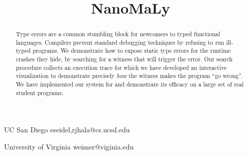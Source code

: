 \documentclass[blind,preprint,nocopyrightspace,10pt,squareay,clearpagebib,explicitsize]{sigplanconf-pldi15}
\theoremstyle{plain}%
\theoremstyle{definition}
\begin{document}
%
%

\title{NanoMaLy}

           {UC San Diego}
           {{eseidel,rjhala}@cs.ucsd.edu}

           {University of Virginia}
           {weimer@viginia.edu}

\maketitle
\begin{abstract}
  Type errors are a common stumbling block for newcomers to typed
  functional languages.
  Compilers prevent standard debugging techniques by refusing to run
  ill-typed programs.
  We demonstrate how to expose static type errors for the runtime
  crashes they hide, by searching for a witness that will trigger the
  error.
  Our search procedure collects an execution trace for which we have
  developed an interactive visualization to demonstrate precisely
  \emph{how} the witness makes the program ``go wrong''.
  We have implemented our system for \ocaml and demonstrate its efficacy
  on a large set of real student programs.
\end{abstract}









% 
\end{document}
